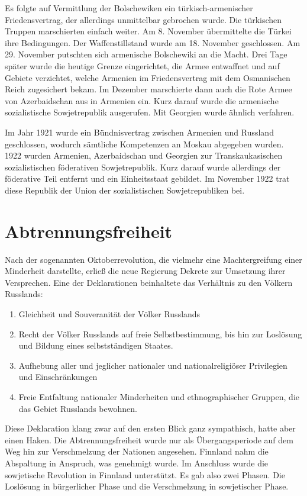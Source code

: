\documentclass[10pt,a4paper,oneside,ngerman,numbers=noenddot]{scrartcl}
\begin{document}
Es folgte auf Vermittlung der Bolschewiken ein türkisch-armenischer Friedensvertrag,
der allerdings unmittelbar gebrochen wurde. Die türkischen Truppen marschierten
einfach weiter. Am 8. November übermittelte die Türkei ihre Bedingungen. Der
Waffenstillstand wurde am 18. November geschlossen. Am 29. November putschten
sich armenische Bolschewiki an die Macht. Drei Tage später wurde die
heutige Grenze eingerichtet, die Armee entwaffnet und auf Gebiete verzichtet,
welche Armenien im Friedensvertrag mit dem Osmanischen Reich zugesichert bekam.
Im Dezember marschierte dann auch die Rote Armee von Azerbaidschan aus in Armenien
ein. Kurz darauf wurde die armenische sozialistische Sowjetrepublik ausgerufen.
Mit Georgien wurde ähnlich verfahren.

Im Jahr 1921 wurde ein Bündnisvertrag zwischen Armenien und Russland geschlossen,
wodurch sämtliche Kompetenzen an Moskau abgegeben wurden. 1922 wurden Armenien,
Azerbaidschan und Georgien zur Transkaukasischen sozialistischen föderativen
Sowjetrepublik. Kurz darauf wurde allerdings der föderative Teil entfernt und
ein Einheitsstaat gebildet. Im November 1922 trat diese Republik der Union
der sozialistischen Sowjetrepubliken bei.

\section{Abtrennungsfreiheit}

Nach der sogenannten Oktoberrevolution, die vielmehr eine Machtergreifung
einer Minderheit darstellte, erließ die neue Regierung Dekrete zur Umsetzung
ihrer Versprechen. Eine der Deklarationen beinhaltete das Verhältnis zu den Völkern
Russlands:

\begin{enumerate}
    \item Gleichheit und Souveranität der Völker Russlands
    \item Recht der Völker Russlands auf freie Selbstbestimmung, bis hin zur
    Loslösung und Bildung eines selbstständigen Staates.
    \item Aufhebung aller und jeglicher nationaler und nationalreligiöser
    Privilegien und Einschränkungen
    \item Freie Entfaltung nationaler Minderheiten und ethnographischer Gruppen,
    die das Gebiet Russlands bewohnen.
\end{enumerate}

Diese Deklaration klang zwar auf den ersten Blick ganz sympathisch, hatte aber
einen Haken. Die Abtrennungsfreiheit wurde nur als Übergangsperiode auf dem
Weg hin zur Verschmelzung der Nationen angesehen. Finnland nahm die Abspaltung
in Anspruch, was genehmigt wurde. Im Anschluss wurde die sowjetische Revolution
in Finnland unterstützt. Es gab also zwei Phasen. Die Loslösung in bürgerlicher
Phase und die Verschmelzung in sowjetischer Phase.
\end{document}
